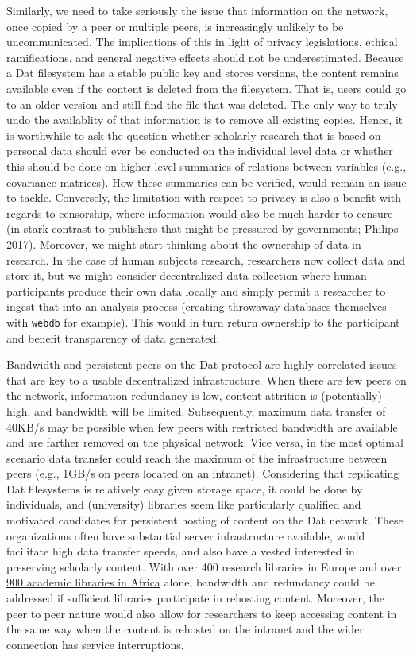 \documentclass[a4paper]{article}
\begin{document}
Similarly, we need to take seriously the issue that information on the
network, once copied by a peer or multiple peers, is increasingly
unlikely to be uncommunicated. The implications of this in light of
privacy legislations, ethical ramifications, and general negative
effects should not be underestimated. Because a Dat filesystem has a
stable public key and stores versions, the content remains available
even if the content is deleted from the filesystem. That is, users could
go to an older version and still find the file that was deleted. The
only way to truly undo the availablity of that information is to remove
all existing copies. Hence, it is worthwhile to ask the question whether
scholarly research that is based on personal data should ever be
conducted on the individual level data or whether this should be done on
higher level summaries of relations between variables (e.g., covariance
matrices). How these summaries can be verified, would remain an issue to
tackle. Conversely, the limitation with respect to privacy is also a
benefit with regards to censorship, where information would also be much
harder to censure (in stark contrast to publishers that might be
pressured by governments; Philips 2017). Moreover, we might start
thinking about the ownership of data in research. In the case of human
subjects research, researchers now collect data and store it, but we
might consider decentralized data collection where human participants
produce their own data locally and simply permit a researcher to ingest
that into an analysis process (creating throwaway databases themselves
with \texttt{webdb} for example). This would in turn return ownership to
the participant and benefit transparency of data generated.

Bandwidth and persistent peers on the Dat protocol are highly correlated
issues that are key to a usable decentralized infrastructure. When there
are few peers on the network, information redundancy is low, content
attrition is (potentially) high, and bandwidth will be limited.
Subsequently, maximum data transfer of 40KB/s may be possible when few
peers with restricted bandwidth are available and are farther removed on
the physical network. Vice versa, in the most optimal scenario data
transfer could reach the maximum of the infrastructure between peers
(e.g., 1GB/s on peers located on an intranet). Considering that
replicating Dat filesystems is relatively easy given storage space, it
could be done by individuals, and (university) libraries seem like
particularly qualified and motivated candidates for persistent hosting
of content on the Dat network. These organizations often have
substantial server infrastructure available, would facilitate high data
transfer speeds, and also have a vested interested in preserving
scholarly content. With over 400 research libraries in Europe and over
\href{http://db.aflia.net/list/?q=6\&m=n}{900 academic libraries in
Africa} alone, bandwidth and redundancy could be addressed if sufficient
libraries participate in rehosting content. Moreover, the peer to peer
nature would also allow for researchers to keep accessing content in the
same way when the content is rehosted on the intranet and the wider
connection has service interruptions.
\end{document}
